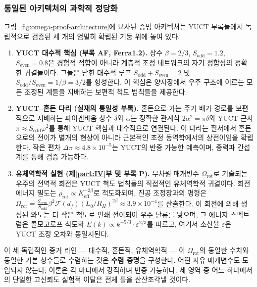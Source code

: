 \documentclass[11pt,a4paper]{article}
\begin{document}
	\subsubsection*{통일된 아키텍처의 과학적 정당화}
	
	그림~\ref{fig:omega-proof-architecture}에 묘사된 증명 아키텍처는 YUCT 부록들에서 독립적으로 검증된 세 개의 엄밀히 확립된 기둥 위에 놓여 있다.
	
	\begin{enumerate}
		\item \textbf{YUCT 대수적 핵심 (부록 AF, Ferra1.2).} 상수 \(\beta = 2/3\), \(S_{\mathrm{odd}}=1.2\), \(S_{\mathrm{even}}=0.8\)은 경험적 적합이 아니라 계층적 조정 네트워크의 자기 정합성의 정확한 귀결들이다. 그들은 닫힌 대수적 루프 \(S_{\mathrm{odd}}+S_{\mathrm{even}}=2\) 및 \(S_{\mathrm{odd}}/S_{\mathrm{even}} = 1/\beta = 3/2\)를 형성한다. 이 핵심은 양자장에서 우주 구조에 이르는 모든 조정된 계들을 지배하는 보편적 척도 법칙들을 제공한다.
		
		\item \textbf{YUCT–혼돈 다리 (실재의 통일성 부록).} 혼돈으로 가는 주기 배가 경로를 보편적으로 지배하는 파이겐바움 상수 \(\delta\)와 \(\alpha\)는 정확한 관계식 \(2\alpha^2 = \pi\delta\)와 YUCT 근사 \(\pi \approx S_{\mathrm{odd}}\varphi^2\)를 통해 YUCT 핵심과 대수적으로 연결된다. 이 다리는 질서에서 혼돈으로의 전이가 별개의 현상이 아니라 근본적인 조정 동역학에서의 상전이임을 확립한다. 작은 편차 \(\Delta\pi \approx 4.8\times10^{-5}\)는 YUCT의 반증 가능한 예측이며, 중력파 간섭계를 통해 검증 가능하다.
		
		\item \textbf{유체역학적 실현 (제\ref{part:IV}부 및 부록 P).} 무차원 매개변수 \(\Omega_{\mathrm{rot}}\)로 기술되는 우주의 전역적 회전은 YUCT 척도 법칙들의 직접적인 유체역학적 귀결이다. 회전 에너지 밀도는 \(\rho_{\mathrm{rot}} \propto K_{\mathrm{eff}}^{-2\beta}\)로 척도화되며, 진공 조정장과의 평형은 \(\Omega_{\mathrm{rot}} = \frac{S_{\mathrm{even}}}{S_{\mathrm{odd}}} \beta^2 \mathcal{F}(d_f) (L_0/R_H)^{2\beta} \approx 3.9\times10^{-4}\)를 산출한다. 이 회전에 의해 생성된 와도는 더 작은 척도로 연쇄 전이되어 우주 난류를 낳으며, 그 에너지 스펙트럼은 콜모고로프 척도화 \(E(k) \propto k^{-5/3} \cdot \varepsilon^{2/3}\)를 따르고, 여기서 소산율 \(\varepsilon\)은 YUCT 조정 오차와 동일시된다.
	\end{enumerate}
	
	이 세 독립적인 증거 라인 — 대수적, 혼돈적, 유체역학적 — 이 \(\Omega_{\mathrm{rot}}\)의 동일한 수치와 동일한 기본 상수들로 수렴하는 것은 \textbf{수렴 증명}을 구성한다. 어떤 자유 매개변수도 도입되지 않는다; 이론은 각 마디에서 강직하며 반증 가능하다. 세 영역 중 어느 하나에서의 단일한 고신뢰도 실험적 이탈은 전체 틀을 산산조각낼 것이다.
	
\end{document}
